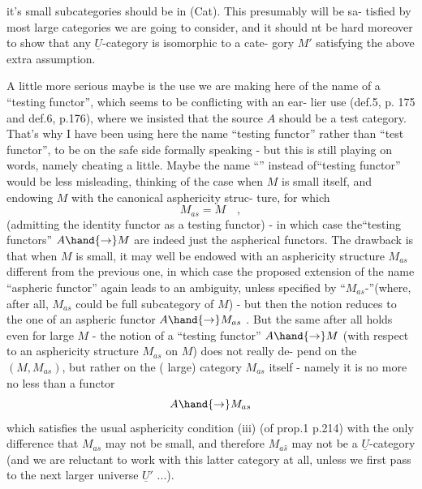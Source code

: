 it's small subcategories should be in (Cat). This presumably will be sa-%
tisfied by most large categories we are going to consider, and it should
nt be hard moreover to show that any $\underline{U}$-category is isomorphic to a cate-%
gory $M'$ satisfying the above extra assumption.

A little more serious maybe is the use we are making here of the
name of a ``testing functor'', which seems to be conflicting with an ear-%
lier use (def.5, p. 175 and def.6, p.176), where we insisted  that
the source $A$ should be a test category. That's why I have been using
here the name ``testing functor'' rather than ``test functor'', to be on
the safe side formally speaking - but this is still playing on words,
namely cheating a little. Maybe the name ``\hand{\uline{\textcolor{black}{aspherical functor}}}'' instead
of``testing functor'' would be less misleading, thinking of the case when
$M$ is small itself, and endowing $M$ with the canonical asphericity struc-%
ture, for which
\[ M_{as} = M \quad , \]
(admitting the identity functor as a testing functor) - in which case
the``testing functors'' $A \hand{\to} M$ are indeed just the aspherical functors.
The drawback is that when $M$ is small,  it may well be endowed with
an asphericity structure $M_{as}$ different from the previous one, in which
case the proposed extension of the name ``aspheric functor'' again leads to
an ambiguity, unless specified by ``$M_{as}$-\hand{\uline{\textcolor{black}{aspheric}}}''(where, after all,
$M_{as}$ could be \hand{\uline{\textcolor{black}{any}}} full subcategory of $M$) - but then the notion reduces
to the one of an aspheric functor $A \hand{\to} M_{as}$ . But the same after all
holds even for large $M$ - the notion of a ``testing functor'' $A \hand{\to} M$
(with respect to an asphericity structure $M_{as}$ on $M$) does not really de-%
pend on the \hand{\uline{\textcolor{black}{pair}}} $(M,M_{as})$, but rather on the ( large) category
$M_{as}$ itself - namely it is no more no less than a functor
\[ A \hand{\to} M_{as} \]
which satisfies the usual asphericity condition (iii) (of prop.1 p.214)\hand{,}
with the only difference that $M_{as}$ may not be small, and therefore 
$M_{as}\hat{}$ may not be a $\underline{U}$-category (and we are  reluctant to work with this
latter category at all, unless we first pass to the next larger universe
$\underline{U}'$ ...).


